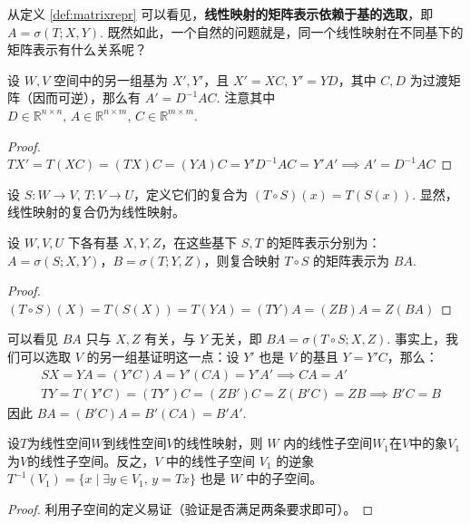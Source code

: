 从定义 \ref{def:matrixrepr} 可以看见，\textbf{线性映射的矩阵表示依赖于基的选取}，即 $A=\sigma(T;X,Y)$. 既然如此，一个自然的问题就是，同一个线性映射在不同基下的矩阵表示有什么关系呢？

\begin{theorem}[同一个线性映射在不同基下的矩阵表示的关系]
设 $W,V$ 空间中的另一组基为 $X',Y'$，且 $X'=XC,\,Y'=YD$，其中 $C,D$ 为过渡矩阵（因而可逆），那么有 $A'=D^{-1}AC$. 
注意其中 $D\in\mathbb R^{n\times n},\,A\in\mathbb R^{n\times m},\,C\in\mathbb R^{m\times m}$.
\end{theorem}
\begin{proof}
$TX'=T(XC)=(TX)C=(YA)C=Y'D^{-1}AC=Y'A'\implies A'=D^{-1}AC$
\end{proof}

\begin{definition}[线性映射的复合]
设 $S:W\to V,\,T: V\to U$，定义它们的复合为 $(T\circ S)(x)=T(S(x))$. 显然，线性映射的复合仍为线性映射。
\end{definition}

\begin{theorem}[复合线性映射的矩阵表示]
设 $W,V,U$ 下各有基 $X,Y,Z$，在这些基下 $S,T$ 的矩阵表示分别为：$A=\sigma(S;X,Y)$，$B=\sigma(T;Y,Z)$，则复合映射 $T\circ S$ 的矩阵表示为 $BA$.
\end{theorem}
\begin{proof}
$(T\circ S)(X)=T(S(X))=T(YA)=(TY)A=(ZB)A=Z(BA)$
\end{proof}

\begin{com}
可以看见 $BA$ 只与 $X,Z$ 有关，与 $Y$ 无关，即 $BA=\sigma(T\circ S;X,Z)$. 事实上，我们可以选取 $V$ 的另一组基证明这一点：设 $Y'$ 也是 $V$ 的基且 $Y=Y'C$，那么：
\begin{align*}
    &SX=YA=(Y'C)A=Y'(CA)=Y'A'\implies CA=A'\\
    &TY=T(Y'C)=(TY')C=(ZB')C=Z(B'C)=ZB\implies B'C=B
\end{align*}
因此 $BA=(B'C)A=B'(CA)=B'A'$.
\end{com}

\begin{theorem}
设$T$为线性空间$W$到线性空间$V$的线性映射，则 $W$ 内的线性子空间$W_1$在$V$中的象$V_1$为$V$的线性子空间。反之，$V$ 中的线性子空间 $V_1$ 的逆象 $T^{-1}(V_1)=\{x\mid \exists y\in V_1,\,y=Tx\}$ 也是 $W$ 中的子空间。
\end{theorem}
\begin{proof}
利用子空间的定义易证（验证是否满足两条要求即可）。
\end{proof}

